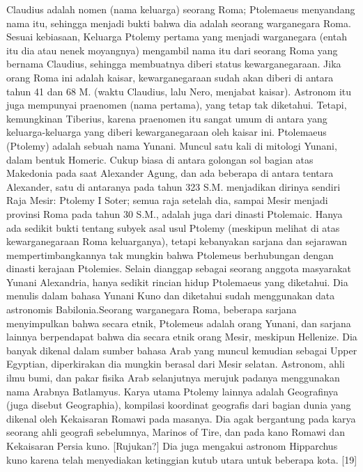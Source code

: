     Claudius adalah nomen (nama keluarga) seorang Roma; Ptolemaeus menyandang nama itu, sehingga menjadi bukti bahwa dia adalah seorang warganegara Roma. Sesuai kebiasaan, Keluarga Ptolemy pertama yang menjadi warganegara (entah itu dia atau nenek moyangnya) mengambil nama itu dari seorang Roma yang bernama Claudius, sehingga membuatnya diberi status kewarganegaraan. Jika orang Roma ini adalah kaisar, kewarganegaraan sudah akan diberi di antara tahun 41 dan 68 M. (waktu Claudius, lalu Nero, menjabat kaisar). Astronom itu juga mempunyai praenomen (nama pertama), yang tetap tak diketahui. Tetapi, kemungkinan Tiberius, karena praenomen itu sangat umum di antara yang keluarga-keluarga yang diberi kewarganegaraan oleh kaisar ini.
    Ptolemaeus (Ptolemy) adalah sebuah nama Yunani. Muncul satu kali di mitologi Yunani, dalam bentuk Homeric. Cukup biasa di antara golongan sol bagian atas Makedonia pada saat Alexander Agung, dan ada beberapa di antara tentara Alexander, satu di antaranya pada tahun 323 S.M. menjadikan dirinya sendiri Raja Mesir: Ptolemy I Soter; semua raja setelah dia, sampai Mesir menjadi provinsi Roma pada tahun 30 S.M., adalah juga dari dinasti Ptolemaic. Hanya ada sedikit bukti tentang subyek asal usul Ptolemy (meskipun melihat di atas kewarganegaraan Roma keluarganya), tetapi kebanyakan sarjana dan sejarawan mempertimbangkannya tak mungkin bahwa Ptolemeus berhubungan dengan dinasti kerajaan Ptolemies.
    Selain dianggap sebagai seorang anggota masyarakat Yunani Alexandria, hanya sedikit rincian hidup Ptolemaeus yang diketahui. Dia menulis dalam bahasa Yunani Kuno dan diketahui sudah menggunakan data astronomis Babilonia.Seorang warganegara Roma, beberapa sarjana menyimpulkan bahwa secara etnik, Ptolemeus adalah orang Yunani, dan sarjana lainnya berpendapat bahwa dia secara etnik orang Mesir, meskipun Hellenize. Dia banyak dikenal dalam sumber bahasa Arab yang muncul kemudian sebagai Upper Egyptian, diperkirakan dia mungkin berasal dari Mesir selatan. Astronom, ahli ilmu bumi, dan pakar fisika Arab selanjutnya merujuk padanya menggunakan nama Arabnya Batlamyus.
    Karya utama Ptolemy lainnya adalah Geografinya (juga disebut Geographia), kompilasi koordinat geografis dari bagian dunia yang dikenal oleh Kekaisaran Romawi pada masanya. Dia agak bergantung pada karya seorang ahli geografi sebelumnya, Marinos of Tire, dan pada kano Romawi dan Kekaisaran Persia kuno. [Rujukan?] Dia juga mengakui astronom Hipparchus kuno karena telah menyediakan ketinggian kutub utara untuk beberapa kota. [19]
   
